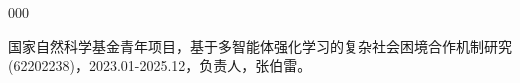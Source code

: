 \begin{publicationsProjects}{000}

    \item [{[1]}]  国家自然科学基金青年项目，基于多智能体强化学习的复杂社会困境合作机制研究(62202238)，2023.01-2025.12，负责人，张伯雷。

\end{publicationsProjects}

